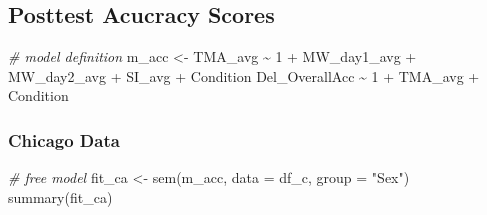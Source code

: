 \documentclass[
  letterpaper,
  DIV=11,
  numbers=noendperiod]{scrartcl}
\newenvironment{Shaded}{\begin{snugshade}}{\end{snugshade}}
\newcommand{\AttributeTok}[1]{\textcolor[rgb]{0.49,0.56,0.16}{#1}}
\newcommand{\CommentTok}[1]{\textcolor[rgb]{0.38,0.63,0.69}{\textit{#1}}}
\newcommand{\FunctionTok}[1]{\textcolor[rgb]{0.02,0.16,0.49}{#1}}
\newcommand{\NormalTok}[1]{\textcolor[rgb]{0.00,0.44,0.13}{#1}}
\newcommand{\OtherTok}[1]{\textcolor[rgb]{0.00,0.44,0.13}{#1}}
\newcommand{\StringTok}[1]{\textcolor[rgb]{0.25,0.44,0.63}{#1}}
\begin{document}
\hypertarget{posttest-acucracy-scores-1}{%
\subsection{Posttest Acucracy Scores}\label{posttest-acucracy-scores-1}}

\begin{Shaded}
\begin{Highlighting}[]
\CommentTok{\# model definition}
\NormalTok{m\_acc }\OtherTok{\textless{}{-}} \StringTok{\textquotesingle{}}
\StringTok{  TMA\_avg \textasciitilde{} 1 + MW\_day1\_avg + MW\_day2\_avg + SI\_avg + Condition}
\StringTok{  Del\_OverallAcc \textasciitilde{} 1 + TMA\_avg + Condition}
\StringTok{\textquotesingle{}}
\end{Highlighting}
\end{Shaded}

\hypertarget{chicago-data}{%
\subsubsection{Chicago Data}\label{chicago-data}}

\begin{Shaded}
\begin{Highlighting}[]
\CommentTok{\# free model}
\NormalTok{fit\_ca }\OtherTok{\textless{}{-}} \FunctionTok{sem}\NormalTok{(m\_acc, }\AttributeTok{data =}\NormalTok{ df\_c, }\AttributeTok{group =} \StringTok{"Sex"}\NormalTok{)}
\FunctionTok{summary}\NormalTok{(fit\_ca)}
\end{Highlighting}
\end{Shaded}
\end{document}
